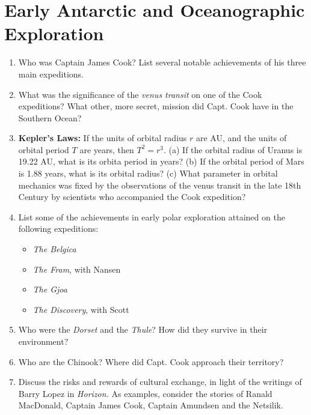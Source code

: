 \documentclass[10pt]{article}
\begin{document}
\twocolumn
\maketitle

\section{Early Antarctic and Oceanographic Exploration}

\begin{enumerate}
\item Who was Captain James Cook?  List several notable achievements of his three main expeditions. \\ \vspace{2cm}
\item What was the significance of the \textit{venus transit} on one of the Cook expeditions? What other, more secret, mission did Capt. Cook have in the Southern Ocean? \\ \vspace{2cm}
\item \textbf{Kepler's Laws:} If the units of orbital radius $r$ are AU, and the units of orbital period $T$ are years, then $T^2 = r^3$.  (a) If the orbital radius of Uranus is 19.22 AU, what is its orbita period in years? (b) If the orbital period of Mars is 1.88 years, what is its orbital radius? (c) What parameter in orbital mechanics was fixed by the observations of the venus transit in the late 18th Century by scientists who accompanied the Cook expedition? \\ \vspace{4cm}
\item List some of the achievements in early polar exploration attained on the following expeditions:
\begin{itemize}
\item \textit{The Belgica}
\item \textit{The Fram}, with Nansen
\item \textit{The Gjoa}
\item \textit{The Discovery}, with Scott
\end{itemize}
\item Who were the \textit{Dorset} and the \textit{Thule}?  How did they survive in their environment? \\ \vspace{1cm}
\item Who are the Chinook? Where did Capt. Cook approach their territory? \\ \vspace{1cm}
\item Discuss the risks and rewards of cultural exchange, in light of the writings of Barry Lopez in \textit{Horizon.}  As examples, consider the stories of Ranald MacDonald, Captain James Cook, Captain Amundsen and the Netsilik. \\ \vspace{5cm}
\end{enumerate}
\end{document}
